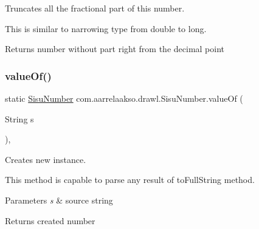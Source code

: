 Truncates all the fractional part of this number. 

This is similar to narrowing type from double to long.

\begin{DoxyReturn}{Returns}
number without part right from the decimal point 
\end{DoxyReturn}
\mbox{\label{classcom_1_1aarrelaakso_1_1drawl_1_1_sisu_number_a2fa3f605463c6f5cb21a08c93289cab3}} 
\subsubsection{\texorpdfstring{value\+Of()}{valueOf()}\hspace{0.1cm}{\footnotesize\ttfamily [1/4]}}
{\footnotesize\ttfamily static \hyperlink{classcom_1_1aarrelaakso_1_1drawl_1_1_sisu_number}{Sisu\+Number} com.\+aarrelaakso.\+drawl.\+Sisu\+Number.\+value\+Of (\begin{DoxyParamCaption}\item[{String}]{s }\end{DoxyParamCaption})\hspace{0.3cm}{\ttfamily [static]}, {\ttfamily [protected]}}



Creates new instance. 

This method is capable to parse any result of to\+Full\+String method.


\begin{DoxyParams}{Parameters}
{\em s} & source string \\
\hline
\end{DoxyParams}
\begin{DoxyReturn}{Returns}
created number 
\end{DoxyReturn}
\mbox{\label{classcom_1_1aarrelaakso_1_1drawl_1_1_sisu_number_aab56528a184c765d49d9e86f2160c1fa}} 
